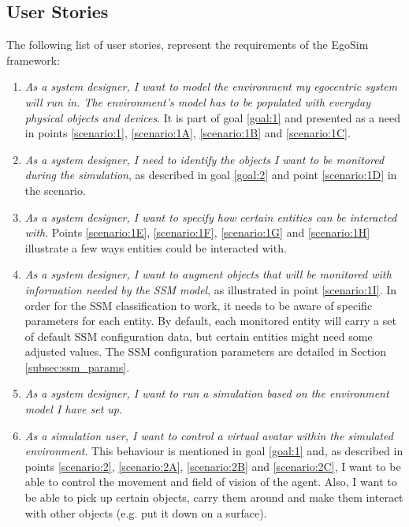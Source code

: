 \subsection{User Stories}\label{subsec:user_stories}
The following list of user stories, represent the requirements of the EgoSim framework:
\begin{enumerate}
	\item[\textlabel{1.}{us:1}] \emph{As a system designer, I want to model the environment my egocentric system will run in. The environment's model has to be populated with everyday physical objects and devices}. It is part of goal \ref{goal:1} and presented as a need in points \ref{scenario:1}, \ref{scenario:1A}, \ref{scenario:1B} and \ref{scenario:1C}.

	\item[\textlabel{2.}{us:2}] \emph{As a system designer, I need to identify the objects I want to be monitored during the simulation}, as described in goal \ref{goal:2} and point \ref{scenario:1D} in the scenario.

	\item[\textlabel{2.1}{us:2.1}] \emph{As a system designer, I want to specify how certain entities can be interacted with}. Points \ref{scenario:1E}, \ref{scenario:1F}, \ref{scenario:1G} and \ref{scenario:1H} illustrate a few ways entities could be interacted with.

	\item[\textlabel{2.2.}{us:2.2}] \emph{As a system designer, I want to augment objects that will be monitored with information needed by the SSM model}, as illustrated in point \ref{scenario:1I}. In order for the SSM classification to work, it needs to be aware of specific parameters for each entity. By default, each monitored entity will carry a set of default SSM configuration data, but certain entities might need some adjusted values. The SSM configuration parameters are detailed in Section \ref{subsec:ssm_params}.

	\item[\textlabel{3.}{us:3}] \emph{As a system designer, I want to run a simulation based on the environment model I have set up}.

	\item[\textlabel{4.}{us:4}] \emph{As a simulation user, I want to control a virtual avatar within the simulated environment}. This behaviour is mentioned in goal \ref{goal:1} and, as described in points \ref{scenario:2}, \ref{scenario:2A}, \ref{scenario:2B} and \ref{scenario:2C}, I want to be able to control the movement and field of vision of the agent. Also, I want to be able to pick up certain objects, carry them around and make them interact with other objects (e.g. put it down on a surface).


\end{enumerate}
